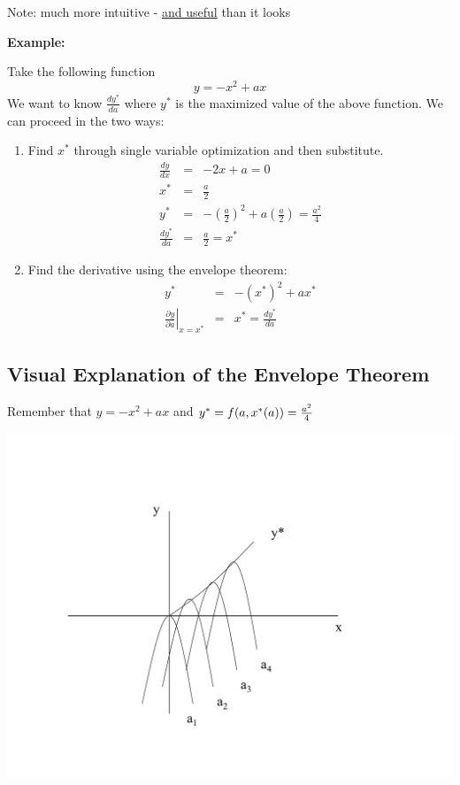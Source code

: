\documentclass[11pt,english]{article}
\begin{document}
Note: much more intuitive - \underline{and useful} than it looks

\textbf{Example:}

Take the following function 
\begin{equation*}
y=-x^{2}+ax
\end{equation*}%
We want to know $\frac{dy^{\ast }}{da}$ where $y^{\ast }$ is the maximized
value of the above function. We can proceed in the two ways:

\begin{enumerate}
\item \bigskip Find $x^{\ast }$ through single variable optimization and
then substitute.%
\begin{eqnarray*}
\frac{dy}{dx} &=&-2x+a=0 \\
x^{\ast } &=&\frac{a}{2} \\
y^{\ast } &=&-\left( \frac{a}{2}\right) ^{2}+a\left( \frac{a}{2}\right) =%
\frac{a^{2}}{4} \\
\frac{dy^{\ast }}{da} &=&\frac{a}{2}=x^{\ast }
\end{eqnarray*}

\item Find the derivative using the envelope theorem: 
\begin{eqnarray*}
y^{\ast } &=&-\left( x^{\ast }\right) ^{2}+ax^{\ast } \\
\left. \frac{\partial y}{\partial a}\right\vert _{x=x^{\ast }} &=&x^{\ast }=%
\frac{dy^{\ast }}{da}
\end{eqnarray*}
\end{enumerate}

\subsection{Visual Explanation of the Envelope Theorem}

\bigskip Remember that $y=-x^{2}+ax$ and $y^{\ast }=f(a,x^{\ast }(a))=\frac{%
a^{2}}{4}$

\includegraphics[scale=0.6]{math9.pdf}
\end{document}

